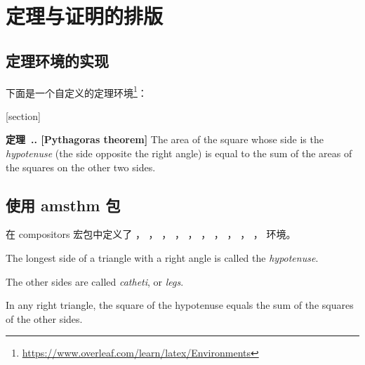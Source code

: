 \chapter{定理与证明的排版}

\section{定理环境的实现}

下面是一个自定义的定理环境\footnote{\url{https://www.overleaf.com/learn/latex/Environments}}：

\begin{texcode}
[section]
\newenvironment{thm}[1][]{\refstepcounter{thm}\par\medskip
   \noindent \textbf{定理~\thesection.\thethm. [#1]} \rmfamily}{\medskip}

\begin{thm}[Pythagoras theorem]
The area of the square whose side is the \textit{hypotenuse} (the side opposite the right angle) is equal to the sum of the areas of the squares on the other two sides.
\end{thm}
\end{texcode}

\section{使用 {\AmS} amsthm 包}

在 compositors 宏包中定义了
，
，
，
，
，
，
，
，
，
，
环境。

\begin{texcode}
\begin{definition}[Hypotenuse]
  The longest side of a triangle with a right angle is called the \emph{hypotenuse}.
\end{definition}
\end{texcode}

\begin{texcode}
\begin{remark}
  The other sides are called \emph{catheti}, or \emph{legs}.
\end{remark}
\end{texcode}

\begin{texcode}
\begin{theorem}[Pythagoras]
  \label{pythagoras}
  In any right triangle, the square of the hypotenuse equals the sum of the squares of the other sides.
\end{theorem}
\end{texcode}

